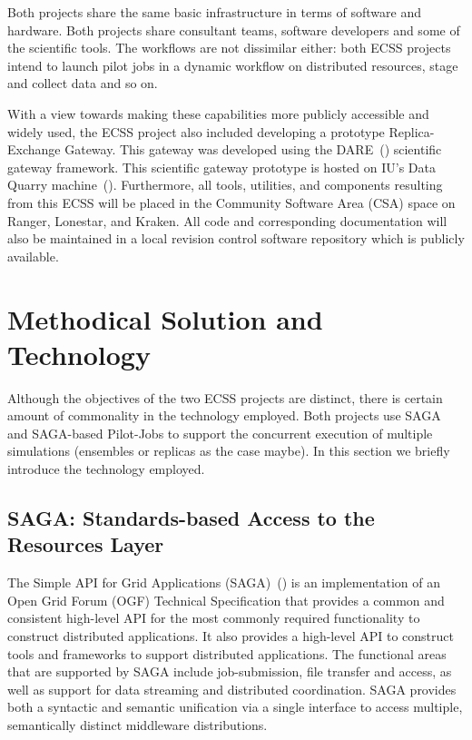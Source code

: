 \documentclass{sig-alternate}
\begin{document}
Both projects share the same basic infrastructure in terms of software and
hardware. Both projects share consultant teams, software developers and some of
the scientific tools. The workflows are not dissimilar either: both ECSS
projects intend to launch pilot jobs in a dynamic workflow on distributed
resources, stage and collect data and so on.

With a view towards making these capabilities more publicly accessible and
widely used, the ECSS project also included developing a prototype
Replica-Exchange Gateway. This gateway was developed using the
DARE~(\cite{DARE})
scientific gateway framework. This scientific gateway prototype is hosted
on IU's Data Quarry machine~(\cite{DataQuarry}). Furthermore, all tools,
utilities, and components resulting from this ECSS will be placed in the Community 
Software Area (CSA) space on Ranger,
Lonestar, and Kraken. All code and corresponding documentation will also be
maintained in a local revision control software repository which is publicly
available.


\section{Methodical Solution and Technology}

Although the objectives of the two ECSS projects are distinct, there
is certain amount of commonality in the technology employed. Both
projects use SAGA and SAGA-based Pilot-Jobs to support the concurrent
execution of multiple simulations (ensembles or replicas as the case
maybe). In this section we briefly introduce the technology employed.

\subsection{SAGA: Standards-based Access to the Resources Layer}

The Simple API for Grid Applications (SAGA)~(\cite{saga_url}) is an
implementation of an Open Grid Forum (OGF) Technical Specification
that provides a common and consistent high-level API for the most
commonly required functionality to construct distributed applications.
It also provides a high-level API to construct tools and frameworks to
support distributed applications. The functional areas that are
supported by SAGA include job-submission, file transfer and access, as
well as support for data streaming and distributed coordination. SAGA
provides both a syntactic and semantic unification via a single
interface to access multiple, semantically distinct middleware
distributions.
\end{document}
